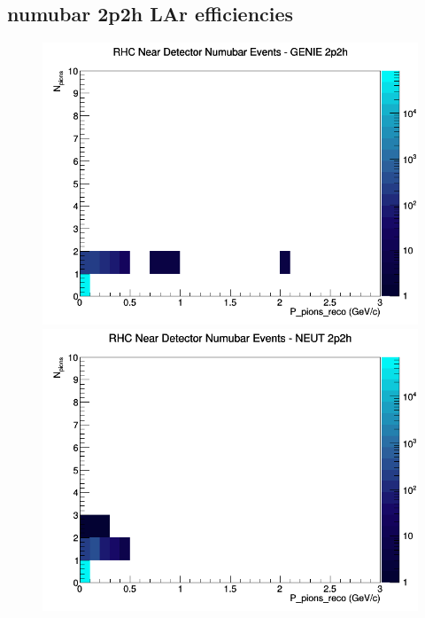 \documentclass[12pt]{article}
\begin{document}
\subsection{numubar 2p2h LAr efficiencies}
\begin{figure}[h]
\includegraphics[width=\linewidth]{eff_N_P/LAr/pions/2p2h_RHC_ND_numubar_N_P_GENIE.png}
\endminipage
{}
\includegraphics[width=\linewidth]{eff_N_P/LAr/pions/2p2h_RHC_ND_numubar_N_P_NEUT.png}
\endminipage
{}

\end{figure}
\end{document}
